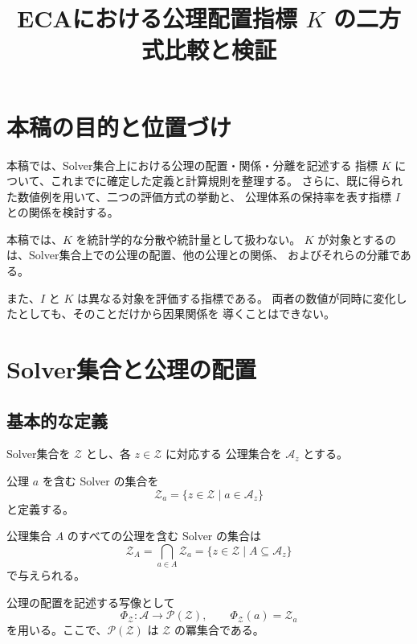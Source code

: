 \documentclass[a4paper,11pt]{ltjsarticle}
\title{ECAにおける公理配置指標 $K$ の二方式比較と検証}
\author{}
\date{}
\begin{document}
\maketitle

\section{本稿の目的と位置づけ}

本稿では、Solver集合上における公理の配置・関係・分離を記述する
指標 $K$ について、これまでに確定した定義と計算規則を整理する。
さらに、既に得られた数値例を用いて、二つの評価方式の挙動と、
公理体系の保持率を表す指標 $I$ との関係を検討する。

本稿では、$K$ を統計学的な分散や統計量として扱わない。
$K$ が対象とするのは、Solver集合上での公理の配置、他の公理との関係、
およびそれらの分離である。

また、$I$ と $K$ は異なる対象を評価する指標である。
両者の数値が同時に変化したとしても、そのことだけから因果関係を
導くことはできない。

\section{Solver集合と公理の配置}

\subsection{基本的な定義}

Solver集合を $\mathcal{Z}$ とし、各 $z\in\mathcal{Z}$ に対応する
公理集合を $\mathcal{A}_z$ とする。

公理 $a$ を含む Solver の集合を
\begin{equation}
  \mathcal{Z}_a
  =
  \{z\in\mathcal{Z}\mid a\in\mathcal{A}_z\}
\end{equation}
と定義する。

公理集合 $A$ のすべての公理を含む Solver の集合は
\begin{equation}
  \mathcal{Z}_A
  =
  \bigcap_{a\in A}\mathcal{Z}_a
  =
  \{z\in\mathcal{Z}\mid A\subseteq\mathcal{A}_z\}
\end{equation}
で与えられる。

公理の配置を記述する写像として
\begin{equation}
  \Phi_{\mathcal{Z}}:
  \mathcal{A}\longrightarrow\mathcal{P}(\mathcal{Z}),
  \qquad
  \Phi_{\mathcal{Z}}(a)=\mathcal{Z}_a
\end{equation}
を用いる。ここで、$\mathcal{P}(\mathcal{Z})$ は
$\mathcal{Z}$ の冪集合である。
\end{document}
